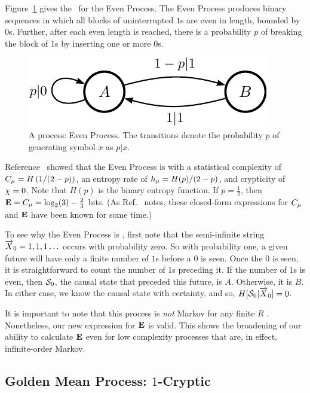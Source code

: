 Figure~\ref{fig:EvenProcess} gives the \eM\ for the Even Process. The Even
Process produces binary sequences in which all blocks of uninterrupted
$1$s are even in length, bounded by $0$s. Further, after each even length
is reached, there is a probability $p$ of breaking the block of $1$s by
inserting one or more $0$s.

\begin{figure}[th]
\centering
\includegraphics{../chapter3/figures/even}
\caption{A  process: Even Process. The transitions denote the
	probability $p$ of generating symbol $x$ as $p|x$.}
\label{fig:EvenProcess}
\end{figure}

Reference~\cite{Crut08b} showed that the Even Process is  with a
statistical complexity of $C_\mu = H \left( 1/(2-p) \right)$, an entropy rate of
$h_\mu = H(p)/(2-p)$, and crypticity of $\chi = 0$. Note that $H(p)$ is the
binary entropy function. If $p = \frac{1}{2}$, then
${\bf E} = C_\mu = \log_2 (3)-\frac{2}{3}$ bits. 
(As Ref.~\cite{Crut08b} notes, these closed-form expressions for $C_\mu$ and
${\bf E}$ have been known for some time.)

To see why the Even Process is , first note that the semi-infinite 
string $\smash{\overrightarrow{{X}}}_0 = 1,1,1\ldots$ occurs with probability zero. So with 
probability one, a given future will have only a finite number of $1$s before 
a $0$ is seen. Once the $0$ is seen, it is straightforward to count the number 
of $1$s preceding it. If the number of $1$s is even, then 
$\mathcal{S}_0$, the causal state that preceded this future, is $A$. 
Otherwise, it is $B$. In either case, we know the causal state with certainty, 
and so, $H[\mathcal{S}_0|\smash{\overrightarrow{{X}}}_0] = 0$.

It is important to note that this process is \emph{not}  Markov for any
finite $R$ \cite{Crut01a}. Nonetheless, our new expression for ${\bf E}$ is valid.
This shows the broadening of our ability to calculate ${\bf E}$ even for low
complexity processes that are, in effect, infinite-order Markov.

\subsection{Golden Mean Process: $1$-Cryptic}

